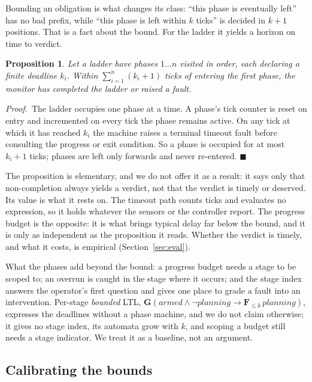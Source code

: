 \documentclass[letterpaper, 10pt, journal, twoside]{IEEEtran}
\newtheorem{proposition}{Proposition}
\newcommand{\proofpar}{\par\noindent\emph{Proof.}\ }
\newcommand{\qedbox}{\hfill$\blacksquare$\par\medskip}
\newcommand{\G}{\mathbf{G}}
\newcommand{\F}{\mathbf{F}}
\begin{document}
Bounding an obligation is what changes its class: ``this phase is
eventually left'' has no bad prefix, while ``this phase is left within
$k$ ticks'' is decided in $k+1$ positions. That is a fact about the
bound. For the ladder it yields a horizon on time to verdict.

\begin{proposition}
\label{prop:bounded}
Let a ladder have phases $1 \dots n$ visited in order, each declaring a
finite deadline $k_i$. Within $\sum_{i=1}^{n} (k_i + 1)$ ticks of
entering the first phase, the monitor has completed the ladder or raised
a fault.
\end{proposition}

\proofpar The ladder occupies one phase at a time. A phase's tick
counter is reset on entry and incremented on every tick the phase
remains active. On any tick at which it has reached $k_i$ the machine
raises a terminal timeout fault before consulting the progress or exit
condition. So a phase is occupied for at most $k_i + 1$ ticks; phases
are left only forwards and never re-entered. \qedbox

The proposition is elementary, and we do not offer it as a result: it
says only that non-completion always yields a verdict, not that the
verdict is timely or deserved. Its value is what it rests on. The
timeout path counts ticks and evaluates no expression, so it holds
whatever the sensors or the controller report. The progress budget is
the opposite: it is what brings typical delay far below the bound, and
it is only as independent as the proposition it reads. Whether the
verdict is timely, and what it costs, is empirical
(Section~\ref{sec:eval}).

What the phases add beyond the bound: a progress budget needs a stage to
be scoped to; an overrun is caught in the stage where it occurs; and the
stage index answers the operator's first question and gives one place to
grade a fault into an intervention. Per-stage \emph{bounded} LTL,
$\G(\mathit{armed} \wedge \neg\mathit{planning} \rightarrow
\F_{\leq k}\,\mathit{planning})$, expresses the deadlines without a
phase machine, and we do not claim otherwise; it gives no stage index,
its automata grow with $k$, and scoping a budget still needs a stage
indicator. We treat it as a baseline, not an argument.

\subsection{Calibrating the bounds}
\label{sec:calib}
\end{document}
